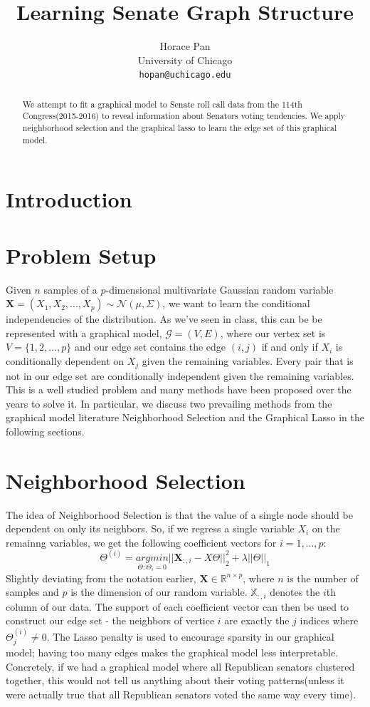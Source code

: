 \documentclass{article}
\title{Learning Senate Graph Structure}
\author{
  Horace Pan\\
  University of Chicago\\
  \texttt{hopan@uchicago.edu} \\
}
\begin{document}

\maketitle

\begin{abstract}
We attempt to fit a graphical model to Senate roll call data from the 114th Congress(2015-2016) to
reveal information about Senators voting tendencies. We apply neighborhood selection and the graphical
lasso to learn the edge set of this graphical model.
\end{abstract}

\section{Introduction}

\section{Problem Setup}
Given $n$ samples of a $p$-dimensional multivariate Gaussian random variable $\mathbf{X} = (X_1, X_2, ..., X_p) \sim \mathcal{N}(\mu, \Sigma)$,
we want to learn the conditional independencies of the distribution. As we've seen in class, this can be
be represented with a graphical model, $\mathcal{G} = (V, E)$, where our vertex set is $V= \{1, 2, ..., p\}$ and our edge set
contains the edge $(i, j)$ if and only if $X_i$ is conditionally dependent on $X_j$ given the remaining variables. Every pair that is
not in our edge set are conditionally independent given the remaining variables. This is a well studied problem and many methods have been proposed over the years to solve it. In particular, we discuss two prevailing methods from the graphical model literature Neighborhood Selection and the Graphical Lasso in the following sections.

\section{Neighborhood Selection}
The idea of Neighborhood Selection is that the value of a single node 
should be dependent on only its neighbors. So, if we regress a single variable $X_i$ on the remainng
variables, we get the following coefficient vectors for $i=1, ..., p$: 
$$\Theta^{(i)} = \underset{\Theta: \Theta_i = 0}{argmin} || \mathbf{X}_{:,i} - X \Theta||_2^2 + \lambda ||\Theta||_1$$
Slightly deviating from the notation earlier, $\mathbf{X} \in \mathbb{R}^{n \times p}$, where $n$ is the number of samples and $p$ is the dimension of our random variable. $\mathbb{X}_{:, i}$ denotes the $i$th column of our data. The support of each coefficient vector can then be used to construct our edge set - the neighbors of vertice $i$ are exactly the $j$ indices where $\Theta_j^{(i)} \not = 0$. 
The Lasso penalty is used to encourage sparsity in our graphical model; having too many edges makes the graphical model less interpretable. 
Concretely, if we had a graphical model where all Republican senators clustered together, this would not tell us anything about their voting patterns(unless it were actually true that all Republican senators voted the same way every time).
\end{document}
